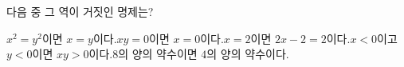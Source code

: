 다음 중 그 역이 거짓인 명제는?
\begin{choicesv}{$x^2=y^2$이면 $x=y$이다.}{$xy=0$이면 $x=0$이다.}{$x=2$이면 $2x-2=2$이다.}{$x<0$이고 $y<0$이면 $xy>0$이다.}{$8$의 양의 약수이면 $4$의 양의 약수이다.}\end{choicesv}
